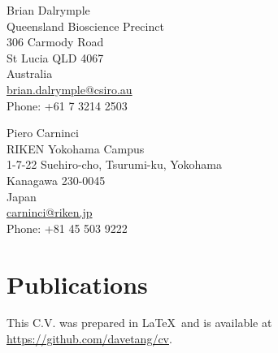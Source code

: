 \documentclass[a4paper, 10pt]{article}
\begin{document}
\begin{minipage}[ht]{.50\textwidth}
Brian Dalrymple \\
Queensland Bioscience Precinct \\
306 Carmody Road \\
St Lucia QLD 4067 \\
Australia \\
\href{mailto:brian.dalrymple@csiro.au}{brian.dalrymple@csiro.au} \\
Phone: +61 7 3214 2503
\end{minipage}
\begin{minipage}[ht]{.50\textwidth}
Piero Carninci \\
RIKEN Yokohama Campus \\
1-7-22 Suehiro-cho, Tsurumi-ku, Yokohama \\
Kanagawa 230-0045 \\
Japan \\
\href{mailto:carninci@riken.jp}{carninci@riken.jp} \\
Phone: +81 45 503 9222
\end{minipage}

\section*{Publications}
\begingroup
   \renewcommand{\section}[2]{}%
   
   \nocite{*}
   
\endgroup

\vfill

\footnotesize
This C.V. was prepared in \LaTeX\ and is available at \href{https://github.com/davetang/cv}{https://github.com/davetang/cv}.
\end{document}
